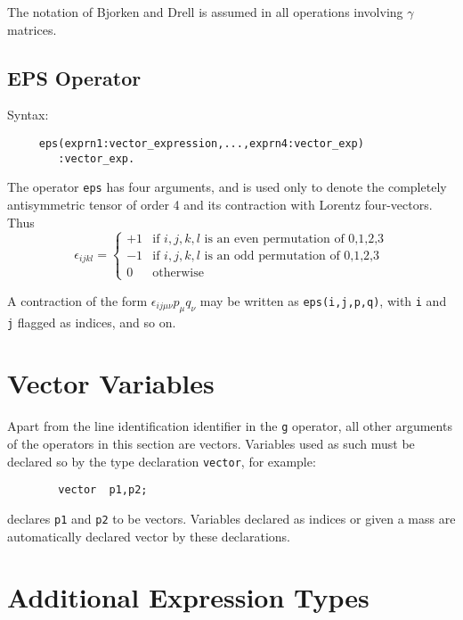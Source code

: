 The notation of Bjorken and Drell is assumed in all operations involving
$\gamma$ matrices.

\subsection{EPS Operator}
\hypertarget{operator:EPS}{}
Syntax:
\begin{verbatim}
     eps(exprn1:vector_expression,...,exprn4:vector_exp)
        :vector_exp.
\end{verbatim}
The operator \texttt{eps} has four arguments, and is used only to denote the
completely antisymmetric tensor of order 4 and its contraction with Lorentz
four-vectors. Thus
\[ \epsilon_{i j k l} = \left\{ \begin{array}{cl}
                                +1 & \mbox{if $i,j,k,l$ is an even permutation
                                              of 0,1,2,3} \\
                                -1 & \mbox{if $i,j,k,l$ is an odd permutation
                                              of 0,1,2,3} \\
                                0 & \mbox{otherwise}
                              \end{array}
                      \right. \]

A contraction of the form $\epsilon_{i j \mu \nu}p_{\mu}q_{\nu}$ may be
written as \texttt{eps(i,j,p,q)}, with \texttt{i} and \texttt{j} flagged as indices,
and so on.

\section{Vector Variables}
\hypertarget{command:VECTOR}{}

Apart from the line identification identifier in the \texttt{g} operator, all
other arguments of the operators in this section are vectors.  Variables
used as such must be declared so by the type declaration \texttt{vector},
 for example:
\begin{verbatim}
        vector  p1,p2;
\end{verbatim}
declares \texttt{p1} and \texttt{p2} to be vectors.  Variables declared as
indices or given a mass are automatically declared
vector by these declarations.

\section{Additional Expression Types}

